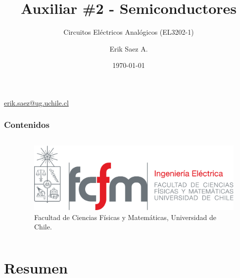 \documentclass[
    10pt,
    aspectratio=169,
    xcolor={dvipsnames},
    spanish,
    ]{beamer}
\title[Auxiliar \#2 - Semiconductores]{\bfseries Auxiliar \#2 - Semiconductores}
\subtitle{Circuitos Eléctricos Analógicos (EL3202-1)}
\author[Erik Saez A.]{Erik Saez A.}
\institute[UChile]{Department of Electrical Engineering \\ Universidad de Chile}
\date{\today}
\begin{document}
\begin{frame}
  \titlepage
  \centering
   \href{mailto:erik.saez@ug.uchile.cl}{erik.saez@ug.uchile.cl} \hspace{.2cm}
\end{frame}

\begin{frame}
  \frametitle{Contenidos}
  \centering
  \begin{columns}
    \begin{column}{0.4\textwidth}
      \tableofcontents
    \end{column}
    \begin{column}{0.5\textwidth}
      \begin{figure}
        \centering
        \includegraphics[width=\textwidth]{fcfm_die}
        \caption{Facultad de Ciencias Físicas y Matemáticas, Universidad de Chile.}
      \end{figure}
    \end{column}
  \end{columns}  
\end{frame}

\section{Resumen}
\end{document}
